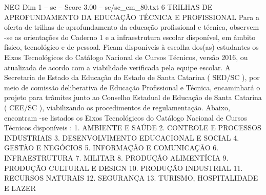 \begin{textsample}{NEG Dim 1 – sc – Score 3.00 – sc/sc\_em\_80.txt}  \label{ex:f1_neg_271}
6 TRILHAS DE APROFUNDAMENTO DA EDUCAÇÃO TÉCNICA E PROFISSIONAL Para a oferta de trilhas de aprofundamento da educação profissional e técnica, observem -se as orientações do Caderno 1 e a infraestrutura escolar disponível, em âmbito físico, tecnológico e de pessoal.
Ficam disponíveis à escolha dos(as) estudantes os Eixos Tecnológicos do Catálogo Nacional de Cursos Técnicos, versão 2016, ou atualizada de acordo com a viabilidade verificada pela equipe escolar.
A Secretaria de Estado da Educação do Estado de Santa Catarina ( SED/SC ), por meio de comissão deliberativa de Educação Profissional e Técnica, encaminhará o projeto para trâmites junto ao Conselho Estadual de Educação de Santa Catarina ( CEE/SC ), viabilizando os procedimentos de regulamentação.
Abaixo, encontram -se listados os Eixos Tecnológicos do Catálogo Nacional de Cursos Técnicos disponíveis : 1.
AMBIENTE E SAÚDE 2.
CONTROLE E PROCESSOS INDUSTRIAIS 3.
DESENVOLVIMENTO EDUCACIONAL E SOCIAL 4.
GESTÃO E NEGÓCIOS 5.
INFORMAÇÃO E COMUNICAÇÃO 6.
INFRAESTRUTURA 7.
MILITAR 8.
PRODUÇÃO ALIMENTÍCIA 9.
PRODUÇÃO CULTURAL E DESIGN 10.
PRODUÇÃO INDUSTRIAL 11.
RECURSOS NATURAIS 12.
SEGURANÇA 13.
TURISMO, HOSPITALIDADE E LAZER

\end{textsample}
